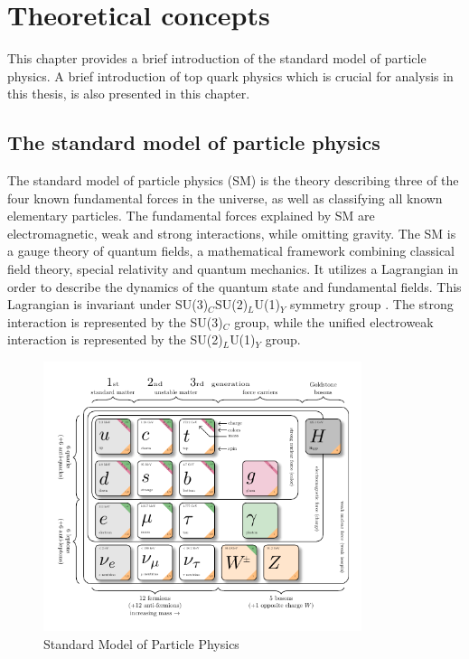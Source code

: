 
\chapter{Theoretical concepts}
\label{chap:theory}

This chapter provides a brief introduction of the standard model of particle physics. A brief introduction of top quark physics which is crucial for analysis in this thesis, is also presented in this chapter.

\section{The standard model of particle physics}

The standard model of particle physics (SM) is the theory describing three of the four known fundamental forces in the universe, as well as classifying all known elementary particles. The fundamental forces explained by SM are electromagnetic, weak and strong interactions, while omitting gravity. The SM is a gauge theory of quantum fields, a mathematical framework combining classical field theory, special relativity and quantum mechanics. It utilizes a Lagrangian in order to describe the dynamics of the quantum state and fundamental fields. This Lagrangian is invariant under SU(3)$_{C}$\times SU(2)$_{L}$\times U(1)$_{Y}$ symmetry group \cite{Peskin:1995ev}. The strong interaction is represented by the SU(3)$_{C}$ group, while the unified electroweak interaction is represented by the SU(2)$_{L}$\times U(1)$_{Y}$ group.  \\

\begin{figure}[!h]
\centering
\includegraphics[width=0.83\textwidth]{ubonn-thesis/Chapters/Chapters_02/Figure/Standard_Model.pdf}
\caption{Standard Model of Particle Physics \cite{sm}}
\label{standardmodel}
\end{figure}

